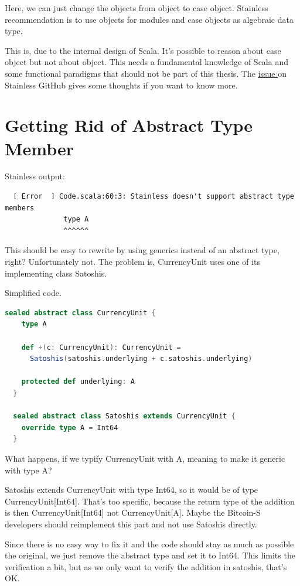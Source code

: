 Here, we can just change the objects from object to case object.
Stainless recommendation is to use objects for modules and case objects as algebraic data type.

This is, due to the internal design of Scala.
It's possible to reason about case object but not about object.
This needs a fundamental knowledge of Scala and some functional paradigms that should not be part of this thesis.
The \href{https://github.com/epfl-lara/stainless/issues/520}{issue } on Stainless GitHub gives some thoughts if you want to know more.


\section{Getting Rid of Abstract Type Member}

Stainless output:
{\footnotesize\begin{verbatim}
  [ Error  ] Code.scala:60:3: Stainless doesn't support abstract type members
              type A
              ^^^^^^
\end{verbatim}}

This should be easy to rewrite by using generics instead of an abstract type, right?
Unfortunately not.
The problem is, CurrencyUnit uses one of its implementing class Satoshis.

Simplified code.
\begin{lstlisting}[language=scala]
  sealed abstract class CurrencyUnit {
    type A

    def +(c: CurrencyUnit): CurrencyUnit =
      Satoshis(satoshis.underlying + c.satoshis.underlying)

    protected def underlying: A
  }

  sealed abstract class Satoshis extends CurrencyUnit {
    override type A = Int64
  }
\end{lstlisting}

What happens, if we typify CurrencyUnit with A, meaning to make it generic with type A?

Satoshis extends CurrencyUnit with type Int64, so it would be of type CurrencyUnit[Int64].
That's too specific, because the return type of the addition is then CurrencyUnit[Int64] not CurrencyUnit[A].
Maybe the Bitcoin-S developers should reimplement this part and not use Satoshis directly.

Since there is no easy way to fix it and the code should stay as much as possible the original, we just remove the abstract type and set it to Int64.
This limits the verification a bit, but as we only want to verify the addition in satoshis, that's OK.


